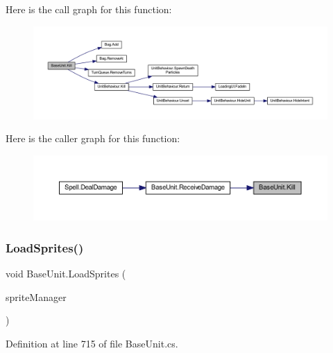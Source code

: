Here is the call graph for this function\+:
\nopagebreak
\begin{figure}[H]
\begin{center}
\leavevmode
\includegraphics[width=350pt]{class_base_unit_ae32912e26fcd7ea4b251045742064af4_cgraph}
\end{center}
\end{figure}
Here is the caller graph for this function\+:
\nopagebreak
\begin{figure}[H]
\begin{center}
\leavevmode
\includegraphics[width=350pt]{class_base_unit_ae32912e26fcd7ea4b251045742064af4_icgraph}
\end{center}
\end{figure}
\mbox{\label{class_base_unit_ab93bf1d3c3ca2899d591a936760d46cf}} 
\subsubsection{\texorpdfstring{LoadSprites()}{LoadSprites()}}
{\footnotesize\ttfamily void Base\+Unit.\+Load\+Sprites (\begin{DoxyParamCaption}\item[{\mbox{\hyperlink{class_sprite_manager}{Sprite\+Manager}}}]{sprite\+Manager }\end{DoxyParamCaption})}



Definition at line 715 of file Base\+Unit.\+cs.

